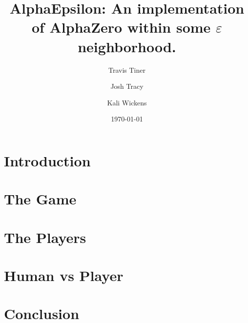 \documentclass[11pt]{article}
\title{AlphaEpsilon: An implementation of AlphaZero within some $\varepsilon$ neighborhood.}
\author{Travis Tiner}
\author{Josh Tracy}
\author{Kali Wickens}
\affil{University of Utah -- Deep Learning}
\date{\today}
\begin{document}
\maketitle

\section{Introduction}

	

\section{The Game}

	

\section{The Players}
	
	
	
	
	
	

	

\section{Human vs Player}

	

\section{Conclusion}

	
%
%
%
%
%
\end{document}
